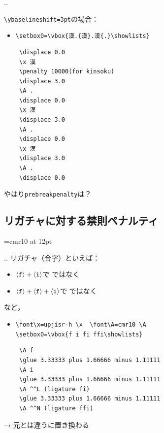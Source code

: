 \documentclass[a5paper,dvipdfmx,14pt]{beamer}
\def\cs#1{\texttt{\char92\nobreak#1}}
\begin{document}
\begin{frame}[t,fragile]{\insertsectionnumber.\insertsubsectionnumber. \insertsubsection}{}
{\small\def\verbnotesize{\scriptsize}
\verb+\ybaselineshift=3pt+の場合：
\begin{itemize}
  \item \verb+\setbox0=\vbox{漢.{漢}.漢{.}\showlists}+
\begin{verbnote}
\begin{verbatim}
 \displace 0.0
 \x 漢
 \penalty 10000(for kinsoku)
 \displace 3.0
 \A .
 \displace 0.0
 \x 漢
 \displace 3.0
 \A .
 \displace 0.0
 \x 漢
 \displace 3.0
 \A .
 \displace 0.0
\end{verbatim}
\end{verbnote}
\end{itemize}\vskip-25pt
やはり\cs{prebreakpenalty}は？
}
\end{frame}

\subsection{リガチャに対する禁則ペナルティ}\label{penalig}
\font\Q=cmr10 at 12pt

\begin{frame}[t,fragile]{\insertsectionnumber.\insertsubsectionnumber. \insertsubsection}
リガチャ（合字）といえば：
\begin{itemize}\small
  \item $\langle\mbox{\texttt{f}}\rangle+\langle\mbox{\texttt{i}}\rangle$\hspace{37pt}で\hspace{5pt}
     ではなく 
  \item $\langle\mbox{\texttt{f}}\rangle+\langle\mbox{\texttt{f}}\rangle+\langle\mbox{\texttt{i}}\rangle$\hspace{7pt}で\hspace{4pt}
     ではなく 
\end{itemize}
など，
{\footnotesize\def\verbnotesize{\scriptsize}
\begin{itemize}
  \item \verb+\font\x=upjisr-h \x  \font\A=cmr10 \A+\\
        \verb+\setbox0=\vbox{f i fi ffi\showlists}+
\begin{verbnote}
\begin{verbatim}
 \A f
 \glue 3.33333 plus 1.66666 minus 1.11111
 \A i
 \glue 3.33333 plus 1.66666 minus 1.11111
 \A ^^L (ligature fi)
 \glue 3.33333 plus 1.66666 minus 1.11111
 \A ^^N (ligature ffi)
\end{verbatim}
\end{verbnote}
\end{itemize}\vskip-20pt
}
→ 元とは違うに置き換わる
\end{frame}
\end{document}
